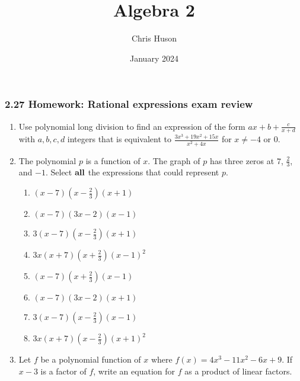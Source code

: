 \documentclass[12pt, twoside]{article}
\title{Algebra 2}
\author{Chris Huson}
\date{January 2024}
\begin{document}
\subsubsection*{2.27 Homework: Rational expressions exam review}
\begin{enumerate}
\item Use polynomial long division to find an expression of the form $ax+b+\frac{c}{x+d}$ with $a,b,c,d$ integers that is equivalent to $\displaystyle \frac{3x^3 + 19x^2 + 15x}{x^2 + 4x}
$ for $x \neq -4 \text{ or } 0$.
\vspace{8cm}

\item The polynomial $p$ is a function of $x$. The graph of $p$ has three zeros at $7$, $\frac{2}{3}$, and $-1$. Select $\bf{all}$ the expressions that could represent $p$. \vspace{0.25cm}
    \begin{multicols}{2}
    \begin{enumerate}
        \item $(x-7)(x-\frac{2}{3})(x+1)$
        \item $(x-7)(3x-2)(x-1)$
        \item $3(x-7)(x-\frac{2}{3})(x+1)$
        \item $3x(x+7)(x+\frac{2}{3})(x-1)^2$
        \item $(x-7)(x+\frac{2}{3})(x-1)$
        \item $(x-7)(3x-2)(x+1)$
        \item $3(x-7)(x-\frac{2}{3})(x-1)$
        \item $3x(x+7)(x-\frac{2}{3})(x+1)^2$
    \end{enumerate}
    \end{multicols}
        \vspace{0.5cm}

\item Let $f$ be a polynomial function of $x$ where $f(x)=4x^3-11x^2-6x+9$. If $x-3$ is a factor of $f$, write an equation for $f$ as a product of linear factors.
\vspace{5cm}


\end{enumerate}
\end{document}
